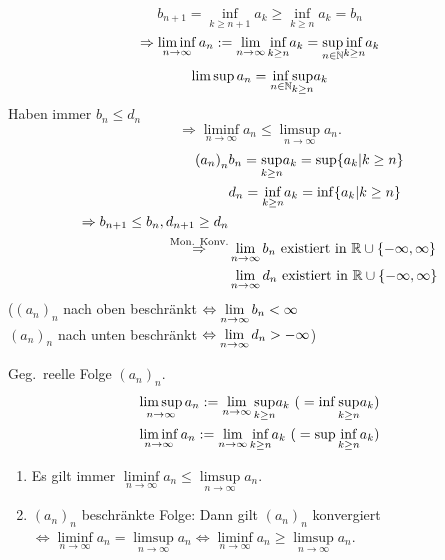 \documentclass[../ana1.tex]{subfiles}
\begin{document}
\[ b_{n+1} = \underset{k\geq n+1}{\inf} a_k \geq \underset{k\geq n}{\inf} a_k = b_n \]
\[ \Rightarrow \liminf\limits_{n\rightarrow\infty} a_n := \lim\limits_{n\rightarrow\infty} \underset{k\geq n}{\inf} a_k = \underset{n\in\mathbb{N}}{\sup} \underset{k\geq n}{\inf} a_k \]
\[ \limsup a_n = \underset{n\in\mathbb{N}}{\inf} \underset{k\geq n}{\sup} a_k \]
Haben immer \(b_n \leq d_n\)
\[ \Rightarrow \liminf\limits_{n\rightarrow\infty} a_n \leq \limsup\limits_{n\rightarrow\infty} a_n. \]
\begin{align*}
	{(a_n)}_n &b_n = \underset{k\geq n}{\sup} a_k = \sup \{ a_k | k\geq n \} \\
	&d_n = \underset{k\geq n}{\inf} a_k = \inf \{ a_k | k\geq n \} \\
	\Rightarrow b_{n+1} \leq b_n, d_{n+1} \geq d_n\\
	\overset{\text{Mon. Konv.}}{\Rightarrow} &\lim\limits_{n\rightarrow\infty} b_n \text{ existiert in }\mathbb{R} \cup \{-\infty, \infty \} \\
	&\lim\limits_{n\rightarrow\infty} d_n \text{ existiert in }\mathbb{R} \cup \{-\infty, \infty \}
\end{align*}
(\({(a_n)}_n\) nach oben beschränkt \(\Leftrightarrow \lim\limits_{n\rightarrow\infty} b_n < \infty \) \\
\({(a_n)}_n\) nach unten beschränkt \(\Leftrightarrow \lim\limits_{n\rightarrow\infty} d_n > -\infty \))
\begin{defi}
	Geg.\ reelle Folge \({(a_n)}_n\).
	\begin{align*}
		\limsup\limits_{n\rightarrow\infty} a_n := \lim\limits_{n\rightarrow\infty}\underset{k\geq n}{\sup} a_k \text{ (}=\inf\underset{k\geq{}n}{\sup}a_k \text{)}\\
		\liminf\limits_{n\rightarrow\infty} a_n := \lim\limits_{n\rightarrow\infty}\underset{k\geq n}{\inf} a_k \text{ (}=\sup\underset{k\geq{}n}{\inf}a_k \text{)}
	\end{align*}
\end{defi}
\begin{lem}
	\begin{enumerate}
		\item Es gilt immer \( \liminf\limits_{n\rightarrow\infty}a_n \leq \limsup\limits_{n\rightarrow\infty}a_n \).
		\item \({(a_n)}_n\) beschränkte Folge: Dann gilt \({(a_n)}_n\) konvergiert \( \Leftrightarrow \liminf\limits_{n\rightarrow\infty}a_n = \limsup\limits_{n\rightarrow\infty}a_n \Leftrightarrow \liminf\limits_{n\rightarrow\infty}a_n \geq \limsup\limits_{n\rightarrow\infty}a_n \).
	\end{enumerate}
\end{lem}
\end{document}

